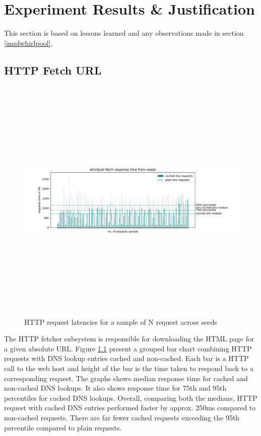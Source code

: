\chapter{Experiment Results \& Justification}
This section is based on lessons learned and any observations made in section \ref{implwhirlpool}.

\section{HTTP Fetch URL}
\begin{figure}[h!]
  \centering
  \includegraphics[width=18cm,height=12cm,keepaspectratio]{../media/crawler/dns_response_time.png}
  \caption{HTTP request latencies for a sample of N request across seeds}
  \label{fig:dnsresponse}
\end{figure}

\noindent
The HTTP fetcher subsystem is responsible for downloading the HTML page for a given absolute URL. Figure
\ref{fig:dnsresponse} present a grouped bar chart combining HTTP requests with DNS lookup entries cached
and non-cached. Each bar is a HTTP call to the web host and height of the bar is the time taken to respond 
back to a corresponding request. The graphs shows median response time for cached and non-cached DNS
lookups. It also shows response time for 75th and 95th percentiles for cached DNS lookups. Overall,
comparing both the medians, HTTP request with cached DNS entries performed faster by approx. 250ms compared to non-cached requests. There are far fewer cached requests exceeding the 95th percentile compared to
plain requests.
\pagebreak

